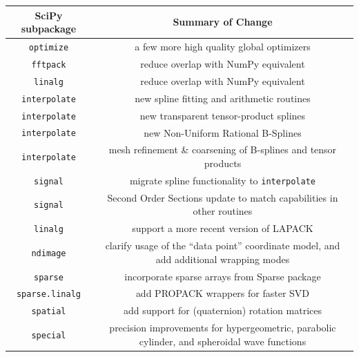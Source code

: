 \documentclass{article}
\begin{document}
\begin{tabular}{ c|c }
    SciPy subpackage & Summary of Change \\
    \hline
    \texttt{optimize} & a few more high quality global optimizers\\
    \texttt{fftpack} & reduce overlap with NumPy equivalent \\
    \texttt{linalg} & reduce overlap with NumPy equivalent \\
    \texttt{interpolate} & new spline fitting and arithmetic routines \\
    \texttt{interpolate} & new transparent tensor-product splines\\
    \texttt{interpolate} & new Non-Uniform Rational B-Splines\\
    \texttt{interpolate} & mesh refinement \& coarsening of B-splines and tensor products\\
    \texttt{signal} & migrate spline functionality to \texttt{interpolate}\\
    \texttt{signal} & Second Order Sections update to match capabilities in other routines\\
    \texttt{linalg} & support a more recent version of LAPACK\\
    \texttt{ndimage} & clarify usage of the ``data point'' coordinate
    model, and add additional wrapping modes\\
    \texttt{sparse} & incorporate sparse arrays from Sparse package\cite{abbasi2018sparse} \\
    \texttt{sparse.linalg} & add PROPACK wrappers for faster SVD\\
    \texttt{spatial} & add support for (quaternion) rotation matrices\\
    \texttt{special} & precision improvements for hypergeometric, parabolic cylinder, and spheroidal wave functions\\
\end{tabular}
\end{document}
